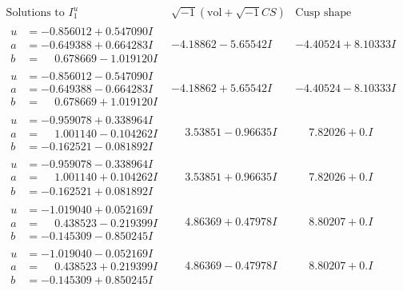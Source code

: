 \documentclass[1p]{elsarticle_modified}
\theoremstyle{definition}
\newcommand{\I}{\sqrt{-1}}
\begin{document}
$$\begin{array}{c|c|c}  
\text{Solutions to }I^u_{1}& \I (\text{vol} + \sqrt{-1}CS) & \text{Cusp shape}\\
 \hline 
\begin{aligned}
u &= -0.856012 + 0.547090 I \\
a &= -0.649388 + 0.664283 I \\
b &= \phantom{-}0.678669 - 1.019120 I\end{aligned}
 & -4.18862 - 5.65542 I & -4.40524 + 8.10333 I \\ \hline\begin{aligned}
u &= -0.856012 - 0.547090 I \\
a &= -0.649388 - 0.664283 I \\
b &= \phantom{-}0.678669 + 1.019120 I\end{aligned}
 & -4.18862 + 5.65542 I & -4.40524 - 8.10333 I \\ \hline\begin{aligned}
u &= -0.959078 + 0.338964 I \\
a &= \phantom{-}1.001140 - 0.104262 I \\
b &= -0.162521 - 0.081892 I\end{aligned}
 & \phantom{-}3.53851 - 0.96635 I & \phantom{-}7.82026 + 0. I\phantom{ +0.000000I} \\ \hline\begin{aligned}
u &= -0.959078 - 0.338964 I \\
a &= \phantom{-}1.001140 + 0.104262 I \\
b &= -0.162521 + 0.081892 I\end{aligned}
 & \phantom{-}3.53851 + 0.96635 I & \phantom{-}7.82026 + 0. I\phantom{ +0.000000I} \\ \hline\begin{aligned}
u &= -1.019040 + 0.052169 I \\
a &= \phantom{-}0.438523 - 0.219399 I \\
b &= -0.145309 - 0.850245 I\end{aligned}
 & \phantom{-}4.86369 + 0.47978 I & \phantom{-}8.80207 + 0. I\phantom{ +0.000000I} \\ \hline\begin{aligned}
u &= -1.019040 - 0.052169 I \\
a &= \phantom{-}0.438523 + 0.219399 I \\
b &= -0.145309 + 0.850245 I\end{aligned}
 & \phantom{-}4.86369 - 0.47978 I & \phantom{-}8.80207 + 0. I\phantom{ +0.000000I} \\ \hline\begin{aligned}

\end{aligned}
\end{array}$$
\end{document}
